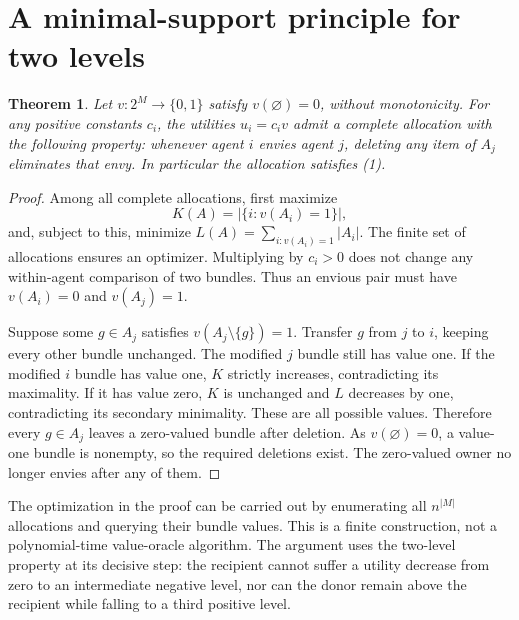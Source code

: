 \documentclass[11pt]{article}
\newtheorem{theorem}{Theorem}
\theoremstyle{definition}
\begin{document}
\section*{A minimal-support principle for two levels}
\begin{theorem}
Let $v:2^M\to\{0,1\}$ satisfy $v(\varnothing)=0$, without monotonicity.
For any positive constants $c_i$, the utilities $u_i=c_i v$ admit a
complete allocation with the following property: whenever agent $i$
envies agent $j$, deleting \emph{any} item of $A_j$ eliminates that envy.
In particular the allocation satisfies (1).
\end{theorem}
\begin{proof}
Among all complete allocations, first maximize
\[
 K(A)=\bigl|\{i:v(A_i)=1\}\bigr|,
\]
and, subject to this, minimize
$L(A)=\sum_{i:v(A_i)=1}|A_i|$.
The finite set of allocations ensures an optimizer. Multiplying by
$c_i>0$ does not change any within-agent comparison of two bundles.
Thus an envious pair must have $v(A_i)=0$ and $v(A_j)=1$.

Suppose some $g\in A_j$ satisfies $v(A_j\setminus\{g\})=1$.
Transfer $g$ from $j$ to $i$, keeping every other bundle unchanged.
The modified $j$ bundle still has value one. If the modified $i$ bundle
has value one, $K$ strictly increases, contradicting its maximality.
If it has value zero, $K$ is unchanged and $L$ decreases by one,
contradicting its secondary minimality. These are all possible values.
Therefore every $g\in A_j$ leaves a zero-valued bundle after deletion.
As $v(\varnothing)=0$, a value-one bundle is nonempty, so the required
deletions exist. The zero-valued owner no longer envies after any of them.
\end{proof}

The optimization in the proof can be carried out by enumerating all
$n^{|M|}$ allocations and querying their bundle values. This is a finite
construction, not a polynomial-time value-oracle algorithm.
The argument uses the two-level property at its decisive step: the
recipient cannot suffer a utility decrease from zero to an intermediate
negative level, nor can the donor remain above the recipient while
falling to a third positive level.
\end{document}
